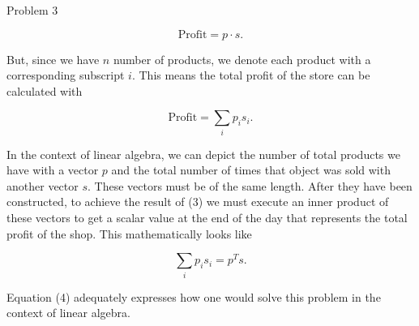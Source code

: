 \begin{problem}{Problem 3}
\begin{Highlight}[Solution]
        \begin{equation}
            \text{Profit} = p \cdot s.
        \end{equation}

        But, since we have $n$ number of products, we denote each product with a corresponding subscript $i$. This means the total profit of the store can be calculated with

        \begin{equation}
            \text{Profit} = \sum_{i} p_{i}s_{i}.
        \end{equation}

        In the context of linear algebra, we can depict the number of total products we have with a vector $p$ and the total number of times that object was sold with another vector $s$. These vectors must be of the
        same length. After they have been constructed, to achieve the result of (3) we must execute an inner product of these vectors to get a scalar value at the end of the day that represents the total profit of the
        shop. This mathematically looks like

        \begin{equation}
            \sum_{i} p_{i}s_{i} = p^{T}s.
        \end{equation}

        Equation (4) adequately expresses how one would solve this problem in the context of linear algebra.
    \end{Highlight}
\end{problem}

